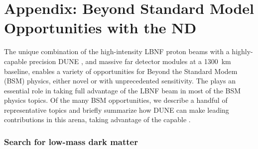 \chapter{Appendix:  Beyond Standard Model Opportunities with the ND}
\label{ch:appx-ndbsm:BSMappendix}

The unique combination of the high-intensity LBNF proton beams with a highly-capable precision DUNE , and massive  far detector modules at a 1300~km baseline, enables a variety of opportunities for Beyond the Standard Modem (BSM) physics, either novel or with unprecedented sensitivity. The  plays an essential role in taking full advantage of the LBNF beam in most of the BSM physics topics.  Of the many BSM opportunities, we describe a handful of representative topics and briefly summarize how DUNE can make leading contributions in this arena, taking advantage of the capable . 

\subsection{Search for low-mass dark matter}
\label{ssec:exsum-nd-BSMappendix-dm}


